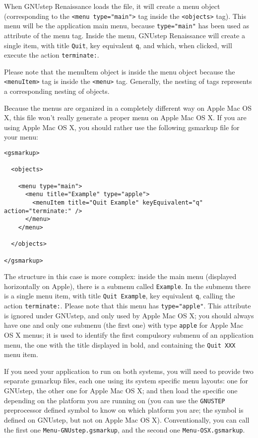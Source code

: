 \documentclass[a4paper]{article}
\begin{document}
When GNUstep Renaissance loads the file, it will create a menu object
(corresponding to the \texttt{<menu type="main">} tag inside the
\texttt{<objects>} tag).  This menu will be the application main menu,
because \texttt{type="main"} has been used as attribute of the menu
tag.  Inside the menu, GNUstep Renaissance will create a single item,
with title \texttt{Quit}, key equivalent \texttt{q}, and which, when
clicked, will execute the action \texttt{terminate:}.

Please note that the menuItem object is inside the menu object because
the \texttt{<menuItem>} tag is inside the \texttt{<menu>} tag.
Generally, the nesting of tags represents a corresponding nesting of
objects.

Because the menus are organized in a completely different way on Apple
Mac OS X, this file won't really generate a proper menu on Apple Mac
OS X.  If you are using Apple Mac OS X, you should rather use the following
gsmarkup file for your menu:
\begin{verbatim}
<gsmarkup>

  <objects>

    <menu type="main">
      <menu title="Example" type="apple">
        <menuItem title="Quit Example" keyEquivalent="q" action="terminate:" />
      </menu>
    </menu>
 
  </objects>

</gsmarkup>
\end{verbatim}
The structure in this case is more complex: inside the main menu
(displayed horizontally on Apple), there is a submenu called
\texttt{Example}.  In the submenu there is a single menu item, with
title \texttt{Quit Example}, key equivalent \texttt{q}, calling the
action \texttt{terminate:}.  Please note that this menu has
\texttt{type="apple"}.  This attribute is ignored under GNUstep, and
only used by Apple Mac OS X; you should always have one and only one
submenu (the first one) with type \texttt{apple} for Apple Mac OS X
menus; it is used to identify the first compulsory submenu of an
application menu, the one with the title displayed in bold, and
containing the \texttt{Quit XXX} menu item.

If you need your application to run on both systems, you will need to
provide two separate gsmarkup files, each one using its system
specific menu layouts: one for GNUstep, the other one for Apple Mac OS
X; and then load the specific one depending on the platform you are
running on (you can use the \texttt{GNUSTEP} preprocessor defined
symbol to know on which platform you are; the symbol is defined on
GNUstep, but not on Apple Mac OS X).  Conventionally, you can call the
first one \texttt{Menu-GNUstep.gsmarkup}, and the second one
\texttt{Menu-OSX.gsmarkup}.
\end{document}
